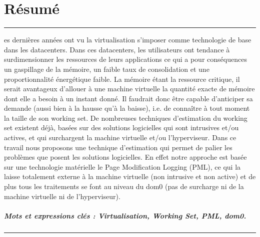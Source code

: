 %
%
%

\chapter*{Résumé}
{
\setstretch{}
\noindent\rule[3pt]{\textwidth}{1pt}
\vspace{.2cm}

es dernières années ont vu la virtualisation s'imposer comme technologie de base dans les datacenters. Dans ces datacenters, les utilisateurs ont tendance à surdimensionner les ressources de leurs applications ce qui a pour conséquences un gaspillage de la mémoire, un faible taux de consolidation et une proportionnalité énergétique faible. La mémoire étant la ressource critique, il serait avantageux d’allouer à une machine virtuelle la quantité exacte de mémoire dont elle a besoin à un instant donné. Il faudrait donc être capable d’anticiper sa demande (aussi bien à la hausse qu’à la baisse), i.e. de connaître à tout moment la taille de son working set. De nombreuses techniques d'estimation du working set existent déjà, basées sur des solutions logicielles qui sont intrusives et/ou actives, et qui surchargent la machine virtuelle et/ou l'hyperviseur. Dans ce travail nous proposons une technique d'estimation qui permet de palier les problèmes que posent les solutions logicielles. En effet notre approche est basée sur une technologie matérielle le Page Modification Logging (PML), ce qui la laisse totalement externe à la machine virtuelle (non intrusive et non active) et de plus tous les traitements se font au niveau du dom0 (pas de surcharge ni de la machine virtuelle ni de l'hyperviseur). 

\paragraph{Mots et expressions clés : Virtualisation, Working Set, PML, dom0.}

\vspace{.2cm}
\noindent\rule[3pt]{\textwidth}{1pt}
}
\clearpage
